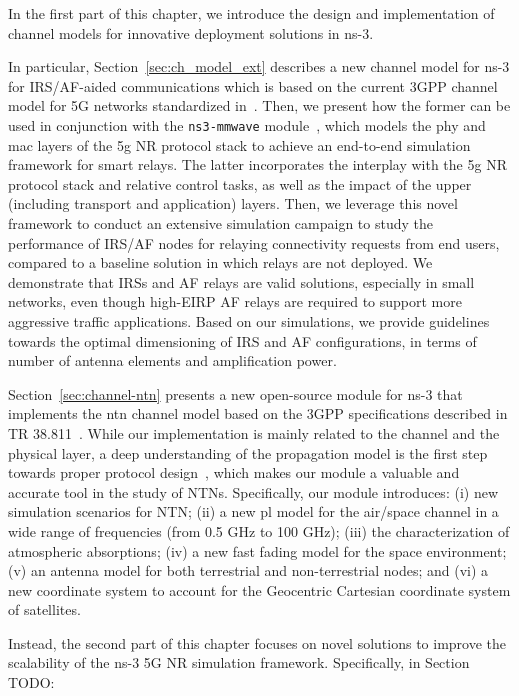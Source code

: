In the first part of this chapter, we introduce the design and implementation of channel models for innovative deployment solutions in ns-3. 

In particular, Section~\ref{sec:ch_model_ext} describes a new channel model for ns-3 for IRS/AF-aided communications which is based on the current 3GPP channel model for 5G networks standardized in~\cite{3gpp.38.901}. 
Then, we present how the former can be used in conjunction with the \texttt{ns3-mmwave} module~\cite{mezzavilla2018end}, which models the \gls{phy} and \gls{mac} layers of the \gls{5g} NR protocol stack to achieve an end-to-end simulation framework for smart relays. The latter incorporates the interplay with the \gls{5g} NR protocol stack and relative control tasks, as well as the impact of the upper (including transport and application) layers. Then, we leverage this novel framework to conduct an extensive simulation campaign to study the performance of IRS/AF nodes for relaying connectivity requests from end users, compared to a baseline solution in which relays are not deployed. We demonstrate that IRSs and AF relays are valid solutions, especially in small networks, even though high-EIRP AF relays are required to support more aggressive traffic applications. Based on our simulations, we provide guidelines towards the optimal dimensioning of IRS and AF configurations, in terms of number of antenna elements and amplification power.

Section~\ref{sec:channel-ntn} presents a new open-source module for ns-3 that implements the \gls{ntn} channel model based on the 3GPP specifications described in TR 38.811~\cite{38811}.
While our implementation is mainly related to the channel and the physical layer, a deep understanding of the propagation model is the first step towards proper protocol design~\cite{lecci2021accuracy}, which makes our module a valuable and accurate tool in the study of NTNs.
Specifically, our module introduces: (i) new simulation scenarios for NTN; (ii) a new \gls{pl} model for the air/space channel in a wide range of frequencies (from 0.5 GHz to 100 GHz); (iii) the characterization of atmospheric absorptions; (iv) a new fast fading model for the space environment; (v) an antenna model for both terrestrial and non-terrestrial nodes; and (vi) a new coordinate system to account for the Geocentric Cartesian coordinate system of satellites. 

Instead, the second part of this chapter focuses on novel solutions to improve the scalability of the ns-3 5G NR simulation framework. Specifically, in Section TODO:


